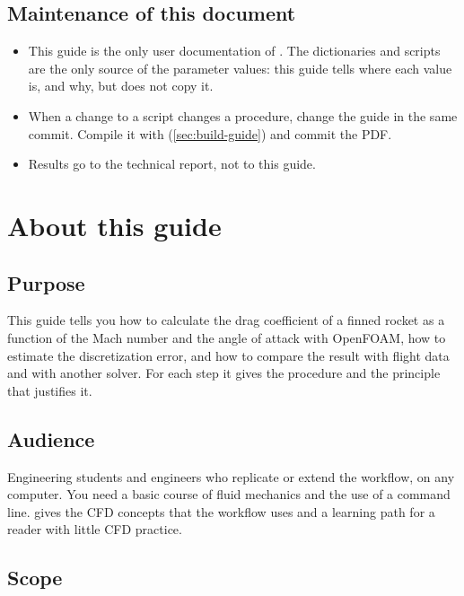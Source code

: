 \section*{Maintenance of this document}

\begin{itemize}
\item This guide is the only user documentation of . The
  dictionaries and scripts are the only source of the parameter values: this guide
  tells where each value is, and why, but does not copy it.
\item When a change to a script changes a procedure, change the guide in the same
  commit. Compile it with  (\cref{sec:build-guide}) and commit the PDF.
\item Results go to the technical report, not to this guide.
\end{itemize}

\tableofcontents
\listoffigures
\listoftables

\chapter*{About this guide}

\section*{Purpose}

This guide tells you how to calculate the drag coefficient of a finned rocket as a
function of the Mach number and the angle of attack with OpenFOAM, how to estimate the
discretization error, and how to compare the result with flight data and with another
solver. For each step it gives the procedure and the principle that justifies it.

\section*{Audience}

Engineering students and engineers who replicate or extend the workflow, on any
computer. You need a basic course of fluid mechanics and the use of a command line.
 gives the CFD concepts that the workflow uses and a learning path
for a reader with little CFD practice.

\section*{Scope}


